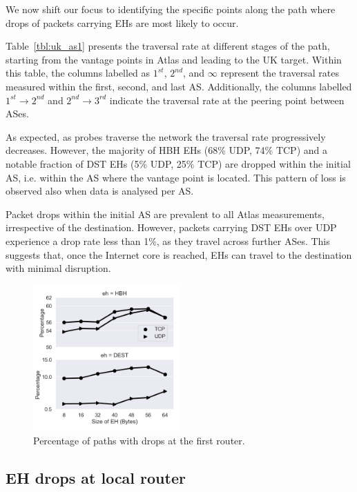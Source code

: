 \documentclass[conference]{IEEEtran}
\begin{document}
We now shift our focus to identifying the specific points along the path where
drops of packets carrying EHs are most likely to occur.

Table~\ref{tbl:uk_as1} presents the traversal rate at different stages of the
path, starting from the vantage points in Atlas and leading to the UK target.
Within this table, the columns labelled as $1^{st}$, $2^{nd}$, and $\infty$
represent the traversal rates measured within the first, second, and last AS.
Additionally, the columns labelled $1^{st}\rightarrow 2^{nd}$ and
$2^{nd}\rightarrow 3^{rd}$ indicate the traversal rate at the peering point
between ASes.

As expected, as probes traverse the network the traversal rate
progressively decreases.  However, the majority of HBH EHs (68\% UDP, 74\% TCP)
and a notable fraction of DST EHs (5\% UDP, 25\% TCP) are dropped within the
initial AS, i.e.  within the AS where the vantage point is located.  This
pattern of loss is observed also when data is analysed per AS.

Packet drops within the initial AS are prevalent to all Atlas measurements,
irrespective of the destination. However, packets carrying DST EHs over UDP
experience a drop rate less than 1\%, as they travel across further ASes.  This
suggests that, once the Internet core is reached, EHs can travel to the
destination with minimal disruption.

\begin{figure}[t]
\centering
  \includegraphics[width=0.5\textwidth]{empty_paths.png}
  \caption{Percentage of paths with drops at the first router.}
  \label{fig:empty_paths}
\end{figure}

\subsection{EH drops at local router}
\end{document}
